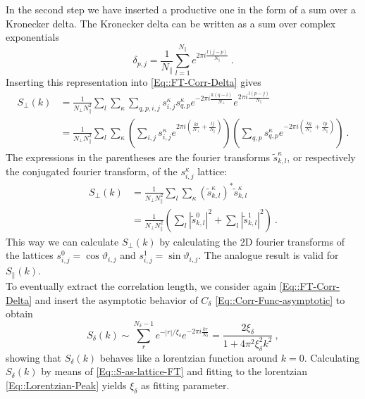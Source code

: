 	In the second step we have inserted a productive one in the form of  a sum over a Kronecker delta. The Kronecker delta can be written as a sum over complex exponentials
	\begin{equation}
		\delta_{p,j} =	\frac{1}{N_\parallel} \sum_{l=1}^{N_\parallel} e^{2 \pi i \frac{l(j - p)}{N_\parallel}}~.
	\end{equation}
	Inserting this representation into \autoref{Eq::FT-Corr-Delta} gives
	\begin{equation}
		\begin{split}
			S_\perp(k) &=	\frac{1}{N_\perp N_\parallel^2} \sum_l \sum_\kappa \sum_{q,p,i,j} s^\kappa_{i,j} s_{q, p}^\kappa e^{-2\pi i \frac{k(q-i)}{N_\perp}} e^{2 \pi i \frac{l(p - j)}{N_\parallel}} \\
			&=	\frac{1}{N_\perp N_\parallel^2} \sum_l \sum_\kappa \left(\sum_{i,j} s^\kappa_{i,j} e^{2\pi i \left(\frac{ki}{N_\perp} + \frac{lj}{N_\parallel} \right)} \right) \left(\sum_{q,p} s_{q, p}^\kappa e^{-2 \pi i \left( \frac{kq}{N_\perp} + \frac{lp}{N_\parallel} \right)} \right)~.
		\end{split}
	\end{equation}
	The expressions in the parentheses are the fourier transforms $\tilde{s}_{k,l}^\kappa$, or respectively the conjugated fourier transform, of the $s_{i,j}^\kappa$ lattice:
	\begin{equation} \label{Eq::S-as-lattice-FT}
		\begin{split}
			S_\perp(k) &=	\frac{1}{N_\perp N_\parallel^2} \sum_l \sum_\kappa \left(\tilde{s}_{k,l}^\kappa\right)^* \tilde{s}_{k,l}^\kappa \\
			&= \frac{1}{N_\perp N_\parallel^2} \left( \sum_l |\tilde{s}_{k,l}^0|^2  + \sum_l |\tilde{s}_{k,l}^1|^2\right)~.
		\end{split}
	\end{equation}
	This way we can calculate $S_\perp(k)$ by calculating the 2D fourier transforms of the lattices $s_{i,j}^0 = \cos \vartheta_{i,j}	$ and $s_{i,j}^1 =	\sin \vartheta_{i,j}$.
	The analogue result is valid for $S_\parallel(k)$. \\
	
	To eventually extract the correlation length, we consider again \autoref{Eq::FT-Corr-Delta} and insert the asymptotic behavior of $C_\delta$  \autoref{Eq::Corr-Func-asymptotic} to obtain
	\begin{equation} \label{Eq::Lorentzian-Peak}
		S_\delta(k) \sim \sum_r^{N_\delta - 1} e^{-|r| /	\xi_\delta} e^{-2\pi i \frac{kr}{N_\delta}} = \frac{2 \xi_\delta}{1 + 4 \pi^2 \xi_\delta^2 k^2}	~,
	\end{equation}
	showing that $S_\delta(k)$ behaves like a lorentzian function around $k=0$. Calculating $S_\delta(k)$ by means of \autoref{Eq::S-as-lattice-FT} and fitting to the lorentzian \autoref{Eq::Lorentzian-Peak} yields $\xi_\delta$ as fitting parameter.
	
